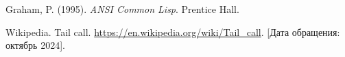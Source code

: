 \begin{thebibliography}{}
	
	 Graham, P. (1995). \textit{ANSI Common Lisp}. Prentice Hall.

	 Wikipedia. Tail call. \url{https://en.wikipedia.org/wiki/Tail_call}. [Дата обращения: октябрь 2024].

	
\end{thebibliography}
